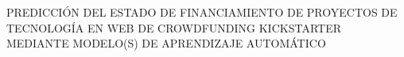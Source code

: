 \thispagestyle{plain}
\begin{center}
	\vspace*{10cm}
	{PREDICCIÓN DEL ESTADO DE FINANCIAMIENTO DE PROYECTOS DE TECNOLOGÍA EN WEB DE CROWDFUNDING KICKSTARTER MEDIANTE MODELO(S) DE APRENDIZAJE AUTOMÁTICO}
\end{center}
